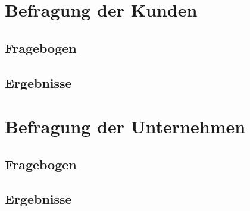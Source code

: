 \appendix
\section{Befragung der Kunden}
\label{sec:kundenbefragung}
\subsection{Fragebogen}
\subsection{Ergebnisse}

\section{Befragung der Unternehmen}
\label{sec:betriebsbefragung}
\subsection{Fragebogen}
\subsection{Ergebnisse}
